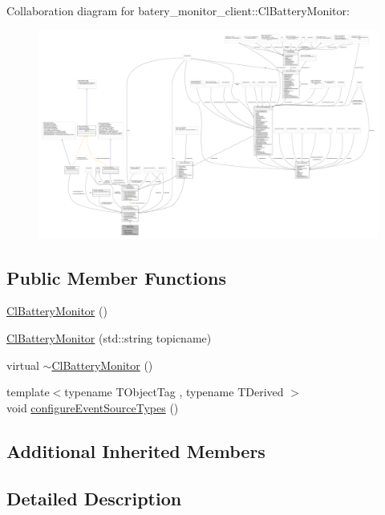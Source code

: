 Collaboration diagram for batery\+\_\+monitor\+\_\+client\+:\+:Cl\+Battery\+Monitor\+:
\nopagebreak
\begin{figure}[H]
\begin{center}
\leavevmode
\includegraphics[width=350pt]{classbatery__monitor__client_1_1ClBatteryMonitor__coll__graph}
\end{center}
\end{figure}
\subsection*{Public Member Functions}
\begin{DoxyCompactItemize}
\item 
\hyperlink{classbatery__monitor__client_1_1ClBatteryMonitor_adece28a13e9aba869600204959c6aa9f}{Cl\+Battery\+Monitor} ()
\item 
\hyperlink{classbatery__monitor__client_1_1ClBatteryMonitor_a8bc3ed6f540d0dba19f5528517f3d76f}{Cl\+Battery\+Monitor} (std\+::string topicname)
\item 
virtual \hyperlink{classbatery__monitor__client_1_1ClBatteryMonitor_a8d62ed866de6f6a82ec951c685e272e6}{$\sim$\+Cl\+Battery\+Monitor} ()
\item 
{\footnotesize template$<$typename T\+Object\+Tag , typename T\+Derived $>$ }\\void \hyperlink{classbatery__monitor__client_1_1ClBatteryMonitor_adeb99f16862455afb3e95fd7c6d05c0a}{configure\+Event\+Source\+Types} ()
\end{DoxyCompactItemize}
\subsection*{Additional Inherited Members}


\subsection{Detailed Description}


